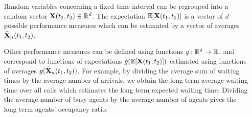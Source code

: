 \begin{comment}
Segments $k=0,\ldots,K-1$ are elementary, i.e., they
contains a single call type~$k$.
If $K>1$, segment $K'-1$ regroups all the $K$ call types.
The remaining $K'-K-1$ segments are user-defined and
therefore optional.
Usually, call types in a
user-defined segment share common properties, i.e., they
can originate from the same region,
corresponding callers can speak the same
language, etc.
If $K\le 1$, we have $K'=K$, and at most one elementary segment
exists;
no user-defined segments are allowed.

In a similar way, let $\Ki'$ be the number of
segments of inbound call types, $\Ko'$ the number of
segments of outbound call
types, and $I'$ the number of
segments of agent groups.

Also let $P'$ be the number of segments of time periods.
User-defined groups of periods can be used, e.g., to represent the
morning, a day in an horizon spanning a week, etc.
\end{comment}


Random variables concerning a fixed time interval
can be regrouped into a
random vector $\mathbf{X}(t_1, t_2)\in\mathbb{R}^d$.
The expectation $\mathbb{E}[\mathbf{X}(t_1, t_2)]$ is a vector of $d$ possible performance measures
which can be estimated by a vector of averages
$\bar{\mathbf{X}}_n(t_1, t_2)$.

Other performance measures can be defined using
functions $g:\mathbb{R}^d\to\mathbb{R}$, and correspond to functions of expectations
$g(\mathbb{E}[\mathbf{X}(t_1, t_2)])$ estimated using
functions of averages
$g(\bar{\mathbf{X}}_n(t_1, t_2))$.
For example, by dividing the average sum of waiting times
by the average number of arrivals, we obtain the
long term average waiting time over all calls
which estimates the long term expected waiting time.
Dividing the average number of busy agents by the average number of
agents gives the long term agents' occupancy ratio.


